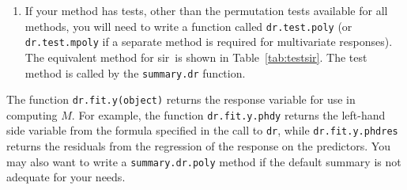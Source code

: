 \documentclass{article}
\newcommand{\dcode}[1]{{\small{\tt #1}}}
\newcommand{\dr}{{\tt dr}}
\newcommand{\sir}{{\sffamily sir}}
\begin{document}
\begin{enumerate}
If your method works differently when \dcode{y} is a matrix,
write a method called \dcode{dr.fit.M.mpoly} to do the
computations for this case.  For \sir, the only difference between
univariate and multivariate responses is in the way the slices are obtained,
and the method \dcode{dr.slices} works for either case.  As a result, a
separate multivariate fit method is not required for \sir.
\begin{table}
\hrule
\caption{The \dcode{dr.test.sir} function.}\label{tab:testsir}
\small\begin{verbatim}
dr.test.sir<-function(object,nd) {
#compute the sir test statistic for the first nd directions
    e<-sort(object$evalues)
    p<-length(object$evalues)
    n<-object$cases
    st<-df<-pv<-0
    nt <- min(p,nd)
    for (i in 0:nt-1)
      {st[i+1]<-n*(p-i)*mean(e[seq(1,p-i)])
       df[i+1]<-(p-i)*(object$slice.info$nslices-i-1)
       pv[i+1]<-1-pchisq(st[i+1],df[i+1])
      }
    z<-data.frame(cbind(st,df,pv))
    rr<-paste(0:(nt-1),"D vs >= ",1:nt,"D",sep="")
    dimnames(z)<-list(rr,c("Stat","df","p-value"))
    z
}
\end{verbatim}
\normalsize\hrule
\end{table}

\item
If your method has tests, other than the permutation tests
available for all methods, you will need to write a function
called \dcode{dr.test.poly} (or \dcode{dr.test.mpoly} if a
separate method is required for multivariate responses).  The
equivalent method for \sir\ is shown in Table~\ref{tab:testsir}.
The test method is called by the \dcode{summary.dr} function.
\end{enumerate}

The function \dcode{dr.fit.y(object)} returns the response
variable for use in computing $M$.  For example, the function
\dcode{dr.fit.y.phdy} returns the left-hand side variable from the
formula specified in the call to \dr, while
\dcode{dr.fit.y.phdres} %
returns
the residuals from the regression of the response on the predictors.
You may also want to write a
\dcode{summary.dr.poly} method if the default summary is not
adequate for your needs.
\end{document}
